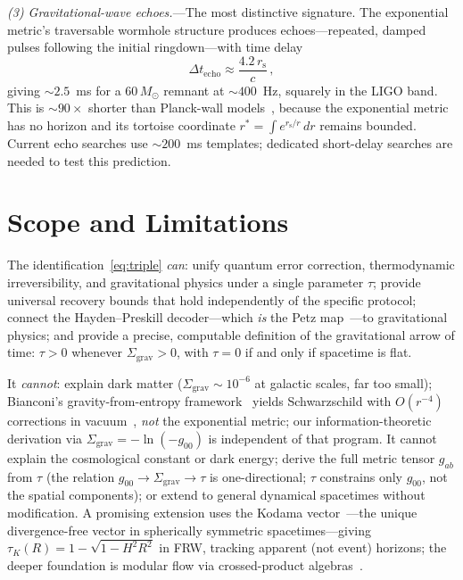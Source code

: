 \documentclass[prl,twocolumn,superscriptaddress,floatfix,nofootinbib]{revtex4-2}
\newcommand{\tauasym}{\tau}
\newcommand{\rs}{r_{\mathrm{s}}}
\newcommand{\Sgrav}{\Sigma_{\mathrm{grav}}}
\begin{document}
\emph{(3) Gravitational-wave echoes.}---The most
distinctive signature.
The exponential metric's traversable wormhole structure
produces echoes---repeated, damped pulses following the
initial ringdown---with time delay
\begin{equation}
  \Delta t_{\text{echo}} \approx \frac{4.2\,\rs}{c}\,,
  \label{eq:echo}
\end{equation}
giving $\sim 2.5$~ms for a $60\,M_\odot$
remnant at $\sim 400$~Hz, squarely in the LIGO band.
This is $\sim 90\times$ shorter than Planck-wall
models~\cite{Cardoso2016}, because the exponential
metric has no horizon and its tortoise coordinate
$r^* = \int e^{\rs/r}\,dr$ remains bounded.
Current echo searches use $\sim 200$~ms
templates; dedicated short-delay searches are needed
to test this prediction.

\section{Scope and Limitations}
\label{sec:scope}

The identification~\eqref{eq:triple} \emph{can}:
unify quantum error correction, thermodynamic
irreversibility, and gravitational physics under a
single parameter $\tauasym$; provide universal recovery
bounds that hold independently of the specific protocol;
connect the Hayden--Preskill decoder---which \emph{is}
the Petz map~\cite{Cotler2019}---to gravitational
physics; and provide a precise, computable definition
of the gravitational arrow of time: $\tauasym > 0$
whenever $\Sgrav > 0$, with $\tauasym = 0$ if and only
if spacetime is flat.

It \emph{cannot}: explain dark matter ($\Sgrav \sim 10^{-6}$
at galactic scales, far too small);
Bianconi's gravity-from-entropy framework~\cite{Bianconi2025GfE}
yields Schwarzschild with $O(r^{-4})$ corrections in vacuum~\cite{Thattarampilly2026},
\emph{not} the exponential metric; our information-theoretic
derivation via $\Sgrav = -\ln(-g_{00})$ is independent of that program.
It cannot explain the cosmological constant or dark energy;
derive the full metric tensor $g_{ab}$ from $\tauasym$
(the relation $g_{00} \to \Sgrav \to \tauasym$
is one-directional; $\tauasym$ constrains only $g_{00}$,
not the spatial components);
or extend to general dynamical spacetimes without
modification.
A promising extension uses the Kodama
vector~\cite{Kodama1980}---the unique divergence-free
vector in spherically symmetric spacetimes---giving
$\tauasym_K(R) = 1 - \sqrt{1 - H^2 R^2}$ in FRW,
tracking apparent (not event) horizons;
the deeper foundation is modular flow via crossed-product
algebras~\cite{Witten2022,Chandrasekaran2023}.
\end{document}
